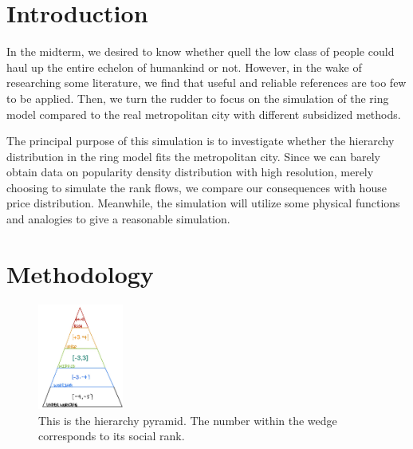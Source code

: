 \documentclass[10pt]{article}
\begin{document}
\setlength{\columnsep}{0.02\textwidth}
\begin{multicols}{2}

\section{Introduction}
    In the midterm, we desired to know whether quell the low class of people could haul up the entire echelon of humankind or not. However, in the wake of researching some literature, we find that useful and reliable references are too few to be applied. Then, we turn the rudder to focus on the simulation of the ring model compared to the real metropolitan city with different subsidized methods. 
         
    The principal purpose of this simulation is to investigate whether the hierarchy distribution in the ring model fits the metropolitan city. Since we can barely obtain data on popularity density distribution with high resolution, merely choosing to simulate the rank flows, we compare our consequences with house price distribution. Meanwhile, the simulation will utilize some physical functions and analogies to give a reasonable simulation.

\section{Methodology}
    
    \begin{figure}[H]
        \centering 
        \includegraphics[width = 0.25\textwidth]{rank.png}
        \caption{This is the hierarchy pyramid. The number within the wedge corresponds to its social rank.}
        \label{rank}
    \end{figure}
    

\end{multicols}
\end{document}
